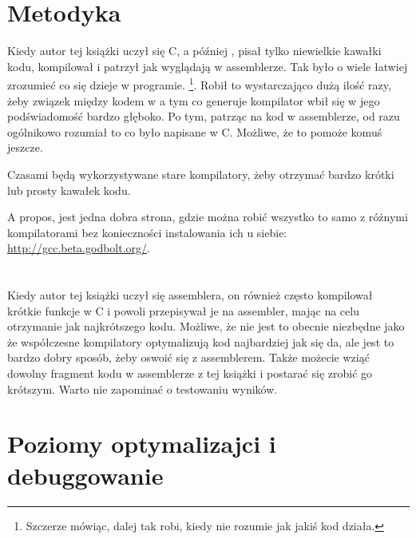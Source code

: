 \section{Metodyka}

Kiedy autor tej książki uczył się C, a później \Cpp, pisał tylko niewielkie kawałki kodu, kompilował i patrzył jak wyglądają w assemblerze. Tak było o wiele łatwiej zrozumieć co się dzieje w programie.%
\footnote{Szczerze mówiąc, dalej tak robi, kiedy nie rozumie jak jakiś kod działa.}.
Robił to wystarczająco dużą ilość razy, żeby związek między kodem w \CCpp a tym co generuje kompilator wbił się w jego podświadomość bardzo głęboko. Po tym, patrząc na kod w assemblerze, od razu ogólnikowo rozumiał to co było napisane w C. Możliwe, że to pomoże komuś jeszcze.


Czasami będą wykorzystywane stare kompilatory, żeby otrzymać bardzo krótki lub prosty kawałek kodu.

A propos, jest jedna dobra strona, gdzie można robić wszystko to samo z różnymi kompilatorami bez konieczności instalowania ich u siebie: \url{http://gcc.beta.godbolt.org/}.

\section*{\Exercises}

Kiedy autor tej książki uczył się assemblera, on również często kompilował krótkie funkcje w C i powoli przepisywał je na assembler, mając na celu otrzymanie jak najkrótszego kodu. Możliwe, że nie jest to obecnie niezbędne jako że współczesne kompilatory optymalizują kod najbardziej jak się da, ale jest to bardzo dobry sposób, żeby oswoić się z assemblerem. Także możecie wziąć dowolny fragment kodu w assemblerze z tej książki i postarać się zrobić go krótszym. Warto nie zapominać o testowaniu wyników.

\section*{Poziomy optymalizajci i debuggowanie}

